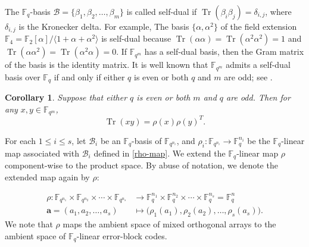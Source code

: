 \documentclass[11pt]{article}
\newtheorem{Corollary}[Theorem]{Corollary}
\newtheorem{Definition and Notation}[Theorem]{Definition and Notation}
\begin{document}
The $\mathbb F_q$-basis $\mathcal{B} = \{\beta_1, \beta_2,\ldots, \beta_m\}$ is called self-dual if  $\operatorname{Tr}(\beta_i\beta_j)=\delta_{i,j}$, where $\delta_{i,j}$ is  the Kronecker delta. For example, The basis $\{\alpha, \alpha^2\}$ of the field extension $ \mathbb F_4 = \mathbb F_2[\alpha]/\langle 1 + \alpha + \alpha^2 \rangle $ is self-dual because $\operatorname{Tr}(\alpha \alpha)=\operatorname{Tr}(\alpha^2 \alpha^2)=1$ and $\operatorname{Tr}(\alpha \alpha^2)=\operatorname{Tr}(\alpha^2 \alpha)=0$. If $\mathbb{F}_{q^m}$ has a self-dual basis, then the Gram matrix of the basis is the identity matrix.  It is well known that $\mathbb{F}_{q^m}$ admits a self-dual basis over $\mathbb{F}_q$ if and only if either $q$ is even or both $q$ and $m$ are odd; see \cite{Seroussi1980}.

\begin{Corollary}
Suppose that either $q$ is even or both $m$ and $q$ are odd. Then for any $x, y\in \mathbb F_{q^m}$,
$$\operatorname{Tr}(xy)=\rho(x) \rho(y)^{T}.$$
\end{Corollary}

For each $1\leq i\leq s$, let $\mathcal{B}_i$ be an $\mathbb F_q$-basis of $\mathbb F_{q^{n_i}}$,  and $\rho_i : \mathbb{F}_{q^{n_i}} \to\mathbb F_q^{n_i}$ be the $\mathbb F_q$-linear map associated with $\mathcal{B}_i$ defined in  \eqref{rho-map}. We extend the $\mathbb F_q$-linear map $\rho$ component-wise to the product space. 
By abuse of notation, we denote the extended map again by $\rho$:

\begin{align}\label{ma12}
    \rho\colon \mathbb{F}_{q^{n_1}}\times\mathbb{F}_{q^{n_2}}\times\cdots\times\mathbb{F}_{q^{n_s}} 
    &\longrightarrow
    \mathbb{F}_q^{n_1}\times\mathbb{F}_q^{n_2}\times\cdots\times\mathbb{F}_q^{n_s}=\mathbb{F}_q^n\\
    \mathbf{a}=(a_1, a_2, \ldots, a_s)
    &\longmapsto \Big(\rho_1(a_1), \rho_2(a_2), \ldots, \rho_s(a_s)\Big).\nonumber
\end{align}
We note that $\rho$ maps the ambient space of mixed orthogonal arrays to the ambient space of $\mathbb F_q$-linear error-block codes.
\end{document}
